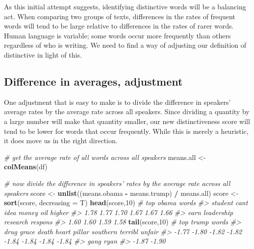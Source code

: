 \documentclass[]{book}
\newenvironment{Shaded}{\begin{snugshade}}{\end{snugshade}}
\newcommand{\CommentTok}[1]{\textcolor[rgb]{0.56,0.35,0.01}{\textit{#1}}}
\newcommand{\DataTypeTok}[1]{\textcolor[rgb]{0.13,0.29,0.53}{#1}}
\newcommand{\DecValTok}[1]{\textcolor[rgb]{0.00,0.00,0.81}{#1}}
\newcommand{\KeywordTok}[1]{\textcolor[rgb]{0.13,0.29,0.53}{\textbf{#1}}}
\newcommand{\NormalTok}[1]{#1}
\newcommand{\OperatorTok}[1]{\textcolor[rgb]{0.81,0.36,0.00}{\textbf{#1}}}
\newcommand{\StringTok}[1]{\textcolor[rgb]{0.31,0.60,0.02}{#1}}
\begin{document}
As this initial attempt suggests, identifying distinctive words will be a balancing act. When comparing two groups of texts, differences in the rates of frequent words will tend to be large relative to differences in the rates of rarer words. Human language is variable; some words occur more frequently than others regardless of who is writing. We need to find a way of adjusting our definition of distinctive in light of this.

\hypertarget{difference-in-averages-adjustment}{%
\subsection{Difference in averages, adjustment}\label{difference-in-averages-adjustment}}

One adjustment that is easy to make is to divide the difference in speakers' average rates by the average rate across all speakers. Since dividing a quantity by a large number will make that quantity smaller, our new distinctiveness score will tend to be lower for words that occur frequently. While this is merely a heuristic, it does move us in the right direction.

\begin{Shaded}
\begin{Highlighting}[]
\CommentTok{# get the average rate of all words across all speakers}
\NormalTok{means.all <-}\StringTok{ }\KeywordTok{colMeans}\NormalTok{(df)}

\CommentTok{# now divide the difference in speakers' rates by the average rate across all speakers}
\NormalTok{score <-}\StringTok{ }\KeywordTok{unlist}\NormalTok{((means.obama }\OperatorTok{-}\StringTok{ }\NormalTok{means.trump) }\OperatorTok{/}\StringTok{ }\NormalTok{means.all)}
\NormalTok{score <-}\StringTok{ }\KeywordTok{sort}\NormalTok{(score, }\DataTypeTok{decreasing =}\NormalTok{ T)}
\KeywordTok{head}\NormalTok{(score,}\DecValTok{10}\NormalTok{) }\CommentTok{# top obama words}
\CommentTok{#>    student       cant       idea      money        oil     higher }
\CommentTok{#>       1.78       1.77       1.70       1.67       1.67       1.66 }
\CommentTok{#>       earn leadership   research    respons }
\CommentTok{#>       1.60       1.60       1.59       1.58}
\KeywordTok{tail}\NormalTok{(score,}\DecValTok{10}\NormalTok{) }\CommentTok{# top trump words}
\CommentTok{#>     drug    grace    death    heart   pillar southern  terribl   unfair }
\CommentTok{#>    -1.77    -1.80    -1.82    -1.82    -1.84    -1.84    -1.84    -1.84 }
\CommentTok{#>     gang     ryan }
\CommentTok{#>    -1.87    -1.90}
\end{Highlighting}
\end{Shaded}
\end{document}
